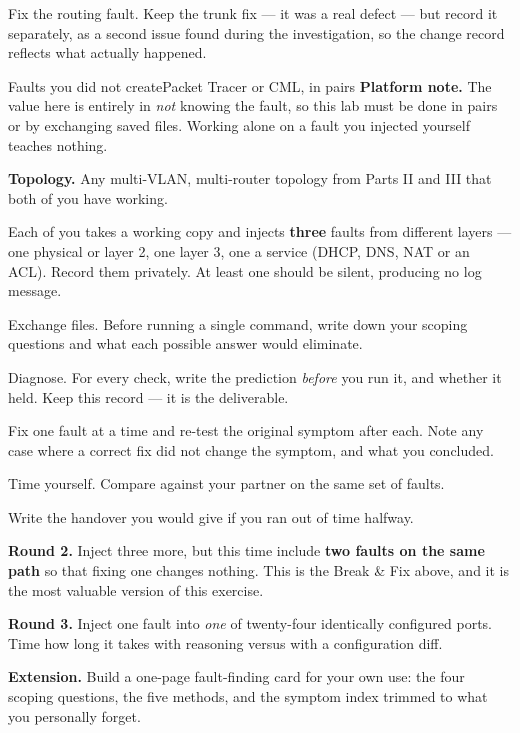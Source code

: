 \begin{breakfix}
Fix the routing fault. Keep the trunk fix --- it was a real defect --- but record
it separately, as a second issue found during the investigation, so the change
record reflects what actually happened.
\end{breakfix}

\begin{lab}{Faults you did not create}{Packet Tracer or CML, in pairs}
\textbf{Platform note.} The value here is entirely in \emph{not} knowing the
fault, so this lab must be done in pairs or by exchanging saved files. Working
alone on a fault you injected yourself teaches nothing.

\textbf{Topology.} Any multi-VLAN, multi-router topology from Parts II and III
that both of you have working.

\begin{tasks}
  \item Each of you takes a working copy and injects \textbf{three} faults from
        different layers --- one physical or layer 2, one layer 3, one a service
        (DHCP, DNS, NAT or an ACL). Record them privately. At least one should
        be silent, producing no log message.
  \item Exchange files. Before running a single command, write down your scoping
        questions and what each possible answer would eliminate.
  \item Diagnose. For every check, write the prediction \emph{before} you run it,
        and whether it held. Keep this record --- it is the deliverable.
  \item Fix one fault at a time and re-test the original symptom after each. Note
        any case where a correct fix did not change the symptom, and what you
        concluded.
  \item Time yourself. Compare against your partner on the same set of faults.
  \item Write the handover you would give if you ran out of time halfway.
  \item \textbf{Round 2.} Inject three more, but this time include \textbf{two
        faults on the same path} so that fixing one changes nothing. This is the
        Break \& Fix above, and it is the most valuable version of this exercise.
  \item \textbf{Round 3.} Inject one fault into \emph{one} of twenty-four
        identically configured ports. Time how long it takes with reasoning
        versus with a configuration diff.
  \item \textbf{Extension.} Build a one-page fault-finding card for your own use:
        the four scoping questions, the five methods, and the symptom index
        trimmed to what you personally forget.
\end{tasks}
\end{lab}

